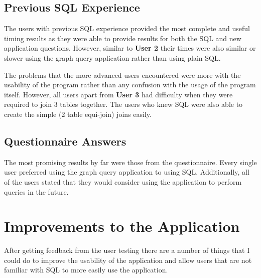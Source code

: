 \subsection{Previous SQL Experience}

The users with previous \ac{SQL} experience provided the most complete and
useful timing results as they were able to provide results for both the
\ac{SQL} and new application questions. However, similar to \textbf{User 2}
their times were also similar or slower using the graph query application
rather than using plain \ac{SQL}.

The problems that the more advanced users encountered were more with the
usability of the program rather than any confusion with the usage of the
program itself. However, all users apart from \textbf{User 3} had difficulty
when they were required to join 3 tables together. The users who knew \ac{SQL}
were also able to create the simple (2 table equi-join) joins easily.

\subsection{Questionnaire Answers}

The most promising results by far were those from the questionnaire. Every
single user preferred using the graph query application to using \ac{SQL}.
Additionally, all of the users stated that they would consider using the
application to perform queries in the future.

\section{Improvements to the Application}

After getting feedback from the user testing there are a number of things that
I could do to improve the usability of the application and allow users that are
not familiar with \ac{SQL} to more easily use the application.

